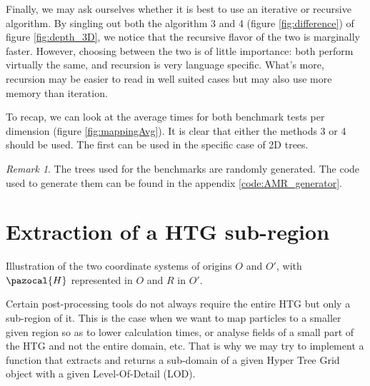 \documentclass[
	a4paper,
	12pt,
	raggedright,
	twoside
]{tufte-style-article}
\theoremstyle{definition}
\theoremstyle{remark}
\newtheorem*{remark}{Remark}
\begin{document}
Finally, we may ask ourselves whether it is best to use an iterative or recursive algorithm. By singling out both the algorithm 3 and 4 (figure \ref{fig:difference}) of figure \ref{fig:depth_3D}, we notice that the recursive flavor of the two is marginally faster. However, choosing between the two is of little importance: both perform virtually the same, and recursion is very language specific. What's more, recursion may be easier to read in well suited cases but may also use more memory than iteration.

\begin{figure}
    \centering
    
\end{figure}

To recap, we can look at the average times for both benchmark tests per dimension (figure \ref{fig:mappingAvg}). It is clear that either the methods 3 or 4 should be used. The first can be used in the specific case of 2D trees.

\begin{figure}[h!]
    \centering
    
\end{figure}

\FloatBarrier

\begin{remark}
The trees used for the benchmarks are randomly generated. The code used to generate them can be found in the appendix \ref{code:AMR_generator}.
\end{remark}

\section{Extraction of a \Gls{HTG} sub-region}
\begin{marginfigure}
    
    \caption{Illustration of the two coordinate systems of origins $O$ and $O'$, with $\pazocal{H}$ represented in $O$ and $R$ in $O'$. \label{fig:cube_dim}}
\end{marginfigure}

Certain post-processing tools do not always require the entire \Gls{HTG} but only a sub-region of it. This is the case when we want to map particles to a smaller given region so as to lower calculation times, or analyse fields of a small part of the \Gls{HTG} and not the entire domain, etc. That is why we may try to implement a function that extracts and returns a sub-domain of a given Hyper Tree Grid object with a given Level-Of-Detail (\Gls{LOD}).
\end{document}
